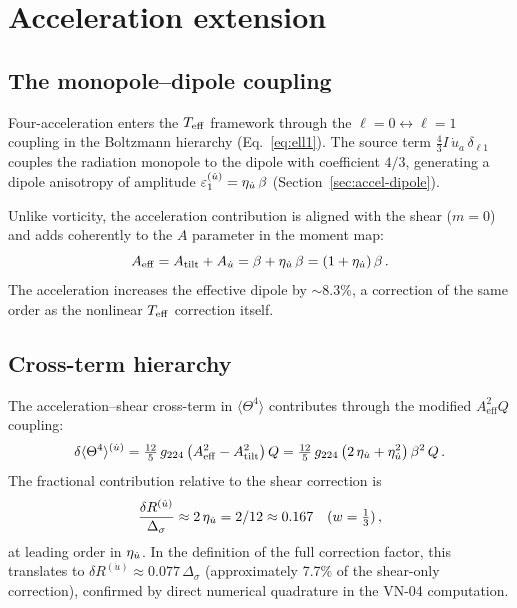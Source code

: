 \section{Acceleration extension}\label{sec:teff-accel}

\subsection{The monopole--dipole coupling}\label{sec:mono-dip}

Four-acceleration enters the $T_{\mathrm{eff}}$ framework through the
$\ell = 0 \leftrightarrow \ell = 1$ coupling in the Boltzmann
hierarchy (Eq.~\eqref{eq:ell1}).  The source term
$\frac{4}{3}I\,\dot{u}_a\,\delta_{\ell 1}$ couples the
radiation monopole to the dipole with coefficient $4/3$,
generating a dipole anisotropy of amplitude
$\varepsilon_1^{(\dot{u})} = \eta_{\dot{u}}\,\beta$
(Section~\ref{sec:accel-dipole}).

Unlike vorticity, the acceleration contribution is aligned with
the shear ($m = 0$) and adds coherently to the $A$ parameter in
the moment map:
\begin{equation}\label{eq:A-eff}
A_{\mathrm{eff}} = A_{\mathrm{tilt}} + A_{\dot{u}}
= \beta + \eta_{\dot{u}}\,\beta = (1 + \eta_{\dot{u}})\,\beta\,.
\end{equation}
The acceleration increases the effective dipole by
$\sim 8.3\%$, a correction of the same order as the nonlinear
$T_{\mathrm{eff}}$ correction itself.


\subsection{Cross-term hierarchy}\label{sec:cross-terms}

The acceleration--shear cross-term in $\langle\Theta^4\rangle$
contributes through the modified $A_{\mathrm{eff}}^2 Q$ coupling:
\begin{equation}
\delta\langle\Theta^4\rangle^{(\dot{u})}
= \tfrac{12}{5}\,g_{224}\,
  \bigl(A_{\mathrm{eff}}^2 - A_{\mathrm{tilt}}^2\bigr)\,Q
= \tfrac{12}{5}\,g_{224}\,
  \bigl(2\,\eta_{\dot{u}} + \eta_{\dot{u}}^2\bigr)\,\beta^2\,Q\,.
\end{equation}
The fractional contribution relative to the shear correction is
\begin{equation}
\frac{\delta R^{(\dot{u})}}{\Delta_\sigma}
\approx 2\,\eta_{\dot{u}} = 2/12 \approx 0.167
\quad (w = \tfrac{1}{3})\,,
\end{equation}
at leading order in $\eta_{\dot{u}}$.  In the definition of the full
correction factor, this translates to
$\delta R^{(\dot{u})} \approx 0.077\,\Delta_\sigma$
(approximately 7.7\% of the shear-only correction), confirmed by
direct numerical quadrature in the VN-04 computation.

